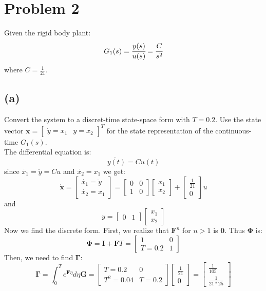 \documentclass{article}
\begin{document}
\section*{Problem 2}
Given the rigid body plant:
\[G_1(s)=\cfrac{y(s)}{u(s)}=\cfrac{C}{s^2}\]
where $C=\frac{1}{21}$.
\subsection*{(a)}
Convert the system to a discret-time state-space form with $T=0.2$. Use the state vector $\pmb{x}=\begin{bmatrix}\dot{y}=x_1& y=x_2\end{bmatrix}^T$ for the state representation of the continuous-time $G_1(s)$.\\
The differential equation is:
\[\ddot{y(t)}=Cu(t)\]
since $\dot{x_1}=\ddot{y}=Cu$ and $\dot{x_2}=x_1$ we get:
\[\dot{\pmb{x}}=\begin{bmatrix}\dot{x_1}=\ddot{y}\\\dot{x_2}=x_1\end{bmatrix}=\begin{bmatrix}0 & 0\\1&0\end{bmatrix}\begin{bmatrix}x_1\\x_2\end{bmatrix}+\begin{bmatrix}\frac{1}{21}\\0\end{bmatrix}u\]
and
\[y=\begin{bmatrix}0 &1\end{bmatrix}\begin{bmatrix}x_1\\x_2\end{bmatrix}\]
Now we find the discrete form. First, we realize that $\pmb{F}^n$ for $n>1$ is $\pmb{0}$. Thus $\pmb{\Phi}$ is:
\[\pmb{\Phi}=\pmb{I}+\pmb{F}T=\begin{bmatrix}1 & 0\\T=0.2 & 1\end{bmatrix}\]
Then, we need to find $\pmb{\Gamma}$:
\[\pmb{\Gamma}=\int_0^Te^{\pmb{F}\eta}d\eta \pmb{G}=\begin{bmatrix}T=0.2&0\\T^2=0.04&T=0.2\end{bmatrix}\begin{bmatrix}\frac{1}{21}\\0\end{bmatrix}=\begin{bmatrix}\frac{1}{105}\\[0.3em]\frac{1}{21*25}\end{bmatrix}\]
\end{document}
